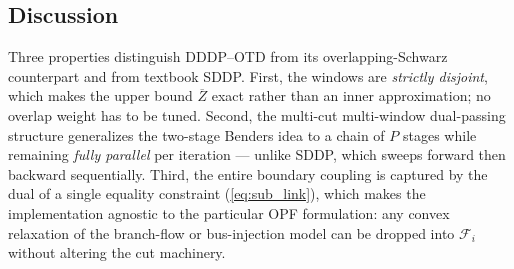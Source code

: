 \subsection{Discussion}
\label{ssec:discussion}

Three properties distinguish DDDP--OTD from its overlapping-Schwarz
counterpart and from textbook SDDP. First, the windows are
\emph{strictly disjoint}, which makes the upper bound $\overline{Z}$
exact rather than an inner approximation; no overlap weight has to be
tuned. Second, the multi-cut multi-window dual-passing structure
generalizes the two-stage Benders idea to a chain of $P$ stages while
remaining \emph{fully parallel} per iteration --- unlike SDDP, which
sweeps forward then backward sequentially. Third, the entire boundary
coupling is captured by the dual of a single equality constraint
(\eqref{eq:sub_link}), which makes the implementation agnostic to the
particular OPF formulation: any convex relaxation of the branch-flow
or bus-injection model can be dropped into $\mathcal{F}_i$ without
altering the cut machinery.

